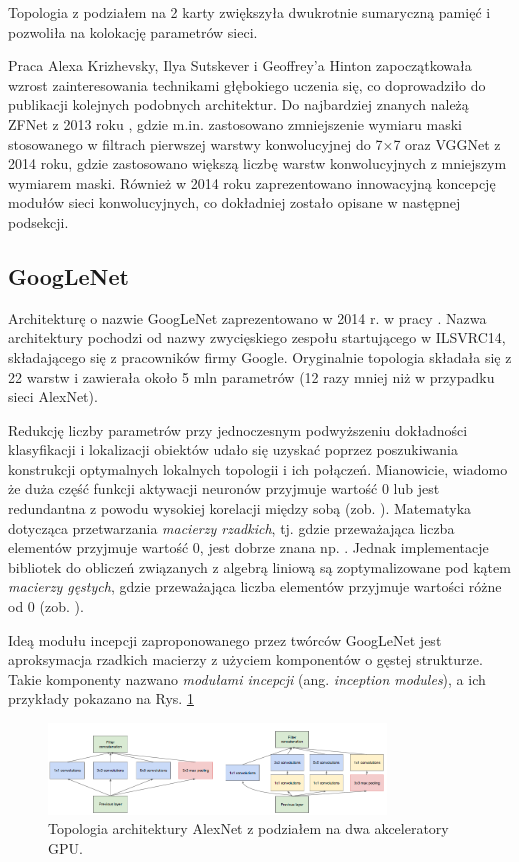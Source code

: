 Topologia z podziałem na 2 karty zwiększyła dwukrotnie sumaryczną pamięć i pozwoliła na kolokację parametrów sieci.

Praca Alexa Krizhevsky, Ilya Sutskever i Geoffrey'a Hinton zapoczątkowała wzrost zainteresowania technikami głębokiego uczenia się, co doprowadziło do publikacji kolejnych podobnych architektur. Do najbardziej znanych należą ZFNet z 2013 roku \cite{ZFNet}, gdzie m.in. zastosowano zmniejszenie wymiaru maski stosowanego w filtrach pierwszej warstwy konwolucyjnej do 7$\times$7 oraz VGGNet \cite{VGGNet} z 2014 roku, gdzie zastosowano większą liczbę warstw konwolucyjnych z mniejszym wymiarem maski. Również w 2014 roku zaprezentowano innowacyjną koncepcję modułów sieci konwolucyjnych, co dokładniej zostało opisane w następnej podsekcji.

\subsection{GoogLeNet}

Architekturę o nazwie GoogLeNet zaprezentowano w 2014 r. w pracy \cite{GoogleNet}. Nazwa architektury pochodzi od nazwy zwycięskiego zespołu startującego w ILSVRC14, składającego się z pracowników firmy Google. Oryginalnie topologia składała się z 22 warstw i zawierała około 5 mln parametrów (12 razy mniej niż w przypadku sieci AlexNet). 

Redukcję liczby parametrów przy jednoczesnym podwyższeniu dokładności klasyfikacji i lokalizacji obiektów udało się uzyskać poprzez poszukiwania konstrukcji optymalnych lokalnych topologii i ich połączeń. Mianowicie, wiadomo że duża część funkcji aktywacji neuronów przyjmuje wartość 0 lub jest redundantna z powodu wysokiej korelacji między sobą (zob. \cite{DBLP:journals/corr/AroraBGM13}). Matematyka dotycząca przetwarzania \textit{macierzy rzadkich}, tj. gdzie przeważająca liczba elementów przyjmuje wartość 0, jest dobrze znana np. \cite{Umit2010}. Jednak implementacje bibliotek do obliczeń związanych z algebrą liniową są zoptymalizowane pod kątem \textit{macierzy gęstych}, gdzie przeważająca liczba elementów przyjmuje wartości różne od 0 (zob. \cite{Song:2014:SUM:2597652.2597670, Krizhevsky2012}). 

Ideą modułu incepcji zaproponowanego przez twórców GoogLeNet jest aproksymacja rzadkich macierzy z użyciem komponentów o gęstej strukturze. Takie komponenty nazwano \textit{modułami incepcji} (ang. \textit{inception modules}), a ich przykłady pokazano na Rys. \ref{GoogleNetInceptionModules} 
\begin{figure}[h!]
	\centering
	\includegraphics[width=0.8\textwidth]{figures/InceptionModules.png}
	\caption{Topologia architektury AlexNet z podziałem na dwa akceleratory GPU.}
	\label{GoogleNetInceptionModules}
\end{figure}

